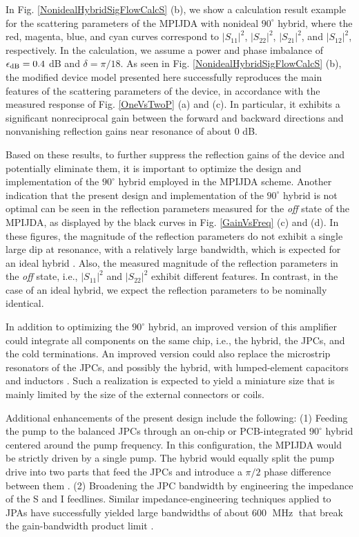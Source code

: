 \documentclass[aip,onecolumn,10pt]{revtex4}%
\begin{document}
In Fig. \ref{NonidealHybridSigFlowCalcS} (b), we show a calculation result example for the scattering parameters of the MPIJDA with nonideal $90^{\circ}$ hybrid, where the red, magenta, blue, and cyan curves correspond to $|S_{11}|^2$, $|S_{22}|^2$, $|S_{21}|^2$, and $|S_{12}|^2$, respectively. In the calculation, we assume a power and phase imbalance of $\epsilon_{\rm{dB}}=0.4$ dB and $\delta=\pi/18$. As seen in Fig. \ref{NonidealHybridSigFlowCalcS} (b), the modified device model presented here successfully reproduces the main features of the scattering parameters of the device, in accordance with the measured response of Fig. \ref{OneVsTwoP} (a) and (c). In particular, it exhibits a significant nonreciprocal gain between the forward and backward directions and nonvanishing reflection gains near resonance of about $0$ dB.     

Based on these results, to further suppress the reflection gains of the device and potentially eliminate them, it is important to optimize the design and implementation of the $90^{\circ}$ hybrid employed in the MPIJDA scheme. Another indication that the present design and implementation of the $90^{\circ}$ hybrid is not optimal can be seen in the reflection parameters measured for the \textit{off} state of the MPIJDA, as displayed by the black curves in Fig. \ref{GainVsFreq} (c) and (d). In these figures, the magnitude of the reflection parameters do not exhibit a single large dip at resonance, with a relatively large bandwidth, which is expected for an ideal hybrid \cite{Pozar}. Also, the measured magnitude of the reflection parameters in the \textit{off} state, i.e., $|S_{11}|^2$ and $|S_{22}|^2$ exhibit different features. In contrast, in the case of an ideal hybrid, we expect the reflection parameters to be nominally identical.

In addition to optimizing the $90^{\circ}$ hybrid, an improved version of this amplifier could integrate all components on the same chip, i.e., the hybrid, the JPCs, and the cold terminations. An improved version could also replace the microstrip resonators of the JPCs, and possibly the hybrid, with lumped-element capacitors and inductors \cite{JPCreview,LumpedJPC,Lumpedhybrids}. Such a realization is expected to yield a miniature size that is mainly limited by the size of the external connectors or coils. 

Additional enhancements of the present design include the following: (1) Feeding the pump to the balanced JPCs through an on-chip or PCB-integrated $90^{\circ}$ hybrid centered around the pump frequency. In this configuration, the MPIJDA would be strictly driven by a single pump. The hybrid would equally split the pump drive into two parts that feed the JPCs and introduce a $\pi/2$ phase difference between them \cite{gyrator}. (2) Broadening the JPC bandwidth by engineering the impedance of the S and I feedlines. Similar impedance-engineering techniques applied to JPAs have successfully yielded large bandwidths of about $600$ $\operatorname{MHz}$ that break the gain-bandwidth product limit \cite{StrongEnvCoupling,JPAimpedanceEng}.         
\end{document}
